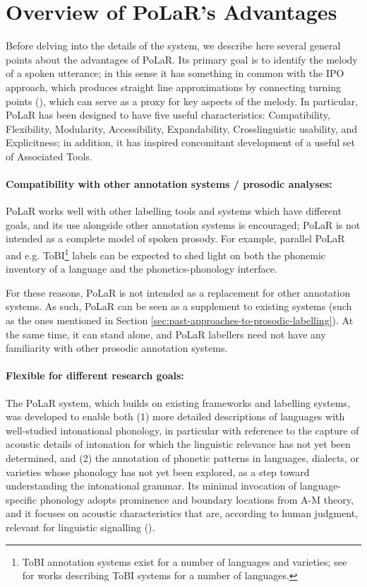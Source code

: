\section{Overview of PoLaR’s Advantages}\label{sec:overview-of-PoLaRs-advantages}
Before delving into the details of the system, we describe here several general points about the advantages of PoLaR. Its primary goal is to identify the melody of a spoken utterance; in this sense it has something in common with the IPO approach, which produces straight line approximations by connecting turning points (\citealt{t-hart-90}), which can serve as a proxy for key aspects of the melody.  In particular, PoLaR has been designed to have five useful characteristics: Compatibility, Flexibility, Modularity, Accessibility, Expandability, Crosslinguistic usability, and Explicitness; in addition, it has inspired concomitant development of a useful set of Associated Tools. 

\paragraph{Compatibility with other annotation systems / prosodic analyses:}
PoLaR works well with other labelling tools and systems which have different goals, and its use alongside other annotation systems is encouraged; PoLaR is not intended as a complete model of spoken prosody.  For example, parallel PoLaR and e.g. ToBI\footnote{ToBI annotation systems exist for a number of languages and varieties; see \citealt{jun05, jun14} for works describing ToBI systems for a number of languages.} labels can be expected to shed light on both the phonemic inventory of a language and the phonetics-phonology interface. 

For these reasons, PoLaR is not intended as a replacement for other annotation systems. As such, PoLaR can be seen as a supplement to existing systems (such as the ones mentioned in Section \ref{sec:past-approaches-to-prosodic-labelling}). At the same time, it can stand alone, and PoLaR labellers need not have any familiarity with other prosodic annotation systems.

\paragraph{Flexible for different research goals:}
The PoLaR system, which builds on existing frameworks and labelling systems, was developed to enable both (1) more detailed descriptions of languages with well-studied intonational phonology, in particular with reference to the capture of acoustic details of intonation for which the linguistic relevance has not yet been determined, and (2) the annotation of phonetic patterns in languages, dialects, or varieties whose phonology has not yet been explored, as a step toward understanding the intonational grammar. Its minimal invocation of language-specific phonology adopts prominence and boundary locations from A-M theory, and it focuses on acoustic characteristics that are, according to human judgment, relevant for linguistic signalling (\citealt{barnesshattuckhufnagel20}).   

